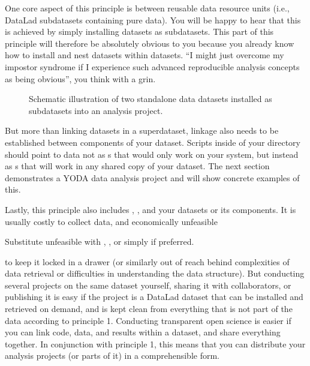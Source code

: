 \sphinxAtStartPar
One core aspect of this principle is  between reusable data
resource units (i.e., DataLad subdatasets containing pure data). You will
be happy to hear that this is achieved by simply installing datasets
as subdatasets.
This part of this principle will therefore be absolutely obvious to you
because you already know how to install and nest datasets within datasets.
“I might just overcome my impostor syndrome if I experience such advanced
reproducible analysis concepts as being obvious”, you think with a grin.

\begin{figure}[tbp]
\centering
\capstart

\noindent{}
\caption{Schematic illustration of two standalone data datasets installed as subdatasets
into an analysis project.}\label{\detokenize{basics/101-127-yoda:id6}}\end{figure}

\sphinxAtStartPar
But more than linking datasets in a superdataset, linkage also needs to
be established between components of your dataset. Scripts inside of
your  directory should point to data not as {\hyperref[\detokenize{glossary:term-absolute-path}]{}}s
that would only work on your system, but instead as {\hyperref[\detokenize{glossary:term-relative-path}]{}}s
that will work in any shared copy of your dataset. The next section
demonstrates a YODA data analysis project and will show concrete examples of this.

\sphinxAtStartPar
Lastly, this principle also includes , , and  your
datasets or its components.
It is usually costly to collect data, and economically unfeasible%
\begin{footnote}\sphinxAtStartFootnote
Substitute unfeasible with , , or simply  if preferred.
%
\end{footnote} to keep
it locked in a drawer (or similarly out of reach behind complexities of
data retrieval or difficulties in understanding the data structure).
But conducting several projects on the same dataset yourself, sharing it with
collaborators, or publishing it is easy if the project is a DataLad dataset
that can be installed and retrieved on demand, and is kept clean from
everything that is not part of the data according to principle 1.
Conducting transparent open science is easier if you can link code, data,
and results within a dataset, and share everything together. In conjunction
with principle 1, this means that you can distribute your analysis projects
(or parts of it) in a comprehensible form.

